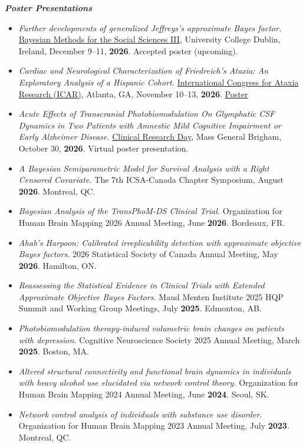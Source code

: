 \documentclass[letterpaper,11pt]{article}
\newenvironment{cvlist}
  {\begin{itemize}[leftmargin=0.15in, label={}, itemsep=2pt, parsep=0pt, topsep=2pt]\small}
  {\end{itemize}}
\begin{document}
\textbf{\small \textit{Poster Presentations}}
\vspace{-5pt}
\begin{cvlist}
\item \textit{Further developments of generalized Jeffreys's approximate Bayes factor.}
\href{https://bayesforshs3.sciencesconf.org/}{Bayesian Methods for the Social Sciences III}, University College Dublin, Ireland, December 9--11, \textbf{2026}. Accepted poster (upcoming).

\item \textit{Cardiac and Neurological Characterization of Friedreich's Ataxia: An Exploratory Analysis of a Hispanic Cohort.}
\href{https://ataxiacongress.org/}{International Congress for Ataxia Research (ICAR)}, Atlanta, GA, November 10--13, \textbf{2026}. \href{https://punnettsquare9331.github.io/posters/cardiac-neurological-friedreich-ataxia-icar-2026.pdf}{\underline{Poster}}

\item \textit{Acute Effects of Transcranial Photobiomodulation On Glymphatic CSF Dynamics in Two Patients with Amnestic Mild Cognitive Impairment or Early Alzheimer Disease.}
\href{https://dcr.massgeneral.org/clinical-research-day-3/}{Clinical Research Day}, Mass General Brigham, October 30, \textbf{2026}. Virtual poster presentation.

\item \textit{A Bayesian Semiparametric Model for Survival Analysis with a Right Censored Covariate.}
The 7th ICSA-Canada Chapter Symposium, August \textbf{2026}. Montreal, QC.

\item \textit{Bayesian Analysis of the TransPhoM-DS Clinical Trial.}
Organization for Human Brain Mapping 2026 Annual Meeting, June \textbf{2026}. Bordeaux, FR.

\item \textit{Ahab's Harpoon: Calibrated irreplicability detection with approximate objective Bayes factors.}
2026 Statistical Society of Canada Annual Meeting, May \textbf{2026}. Hamilton, ON.

\item \textit{Reassessing the Statistical Evidence in Clinical Trials with Extended Approximate Objective Bayes Factors.}
Maud Menten Institute 2025 HQP Summit and Working Group Meetings, July \textbf{2025}. Edmonton, AB.

\item \textit{Photobiomodulation therapy-induced volumetric brain changes on patients with depression.}
Cognitive Neuroscience Society 2025 Annual Meeting, March \textbf{2025}. Boston, MA.

\item \textit{Altered structural connectivity and functional brain dynamics in individuals with heavy alcohol use elucidated via network control theory.}
Organization for Human Brain Mapping 2024 Annual Meeting, June \textbf{2024}. Seoul, SK.

\item \textit{Network control analysis of individuals with substance use disorder.}
Organization for Human Brain Mapping 2023 Annual Meeting, July \textbf{2023}. Montreal, QC.
\end{cvlist}
\end{document}
